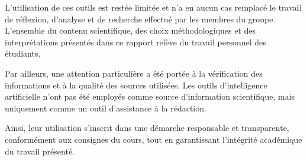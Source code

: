 \documentclass[a4paper,11pt]{article}
\begin{document}
L’utilisation de ces outils est restée limitée et n’a en aucun cas remplacé le travail de réflexion, d’analyse et de recherche effectué par les membres du groupe. L’ensemble du contenu scientifique, des choix méthodologiques et des interprétations présentés dans ce rapport relève du travail personnel des étudiants.

Par ailleurs, une attention particulière a été portée à la vérification des informations et à la qualité des sources utilisées. Les outils d’intelligence artificielle n’ont pas été employés comme source d’information scientifique, mais uniquement comme un outil d’assistance à la rédaction.

Ainsi, leur utilisation s’inscrit dans une démarche responsable et transparente, conformément aux consignes du cours, tout en garantissant l’intégrité académique du travail présenté.

\clearpage
\nocite{*}
\printbibliography[heading=bibintoc,title={Bibliographie}]

\end{document}

